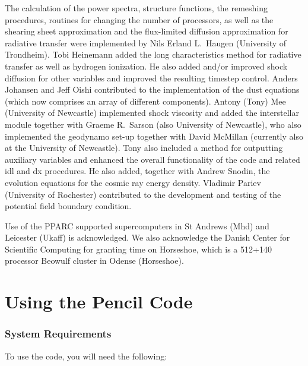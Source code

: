 \documentclass[\mydriver,12pt,twoside,notitlepage,a4paper]{article}
\begin{document}
The calculation of the power spectra, structure functions,
the remeshing procedures,
routines for changing the number of processors, as well as
the shearing sheet approximation and the flux-limited diffusion
approximation for radiative transfer
were implemented by Nils Erland L.\ Haugen (University of Trondheim).
Tobi Heinemann added the long characteristics method for
radiative transfer as well as hydrogen ionization.
He also added and/or improved shock diffusion for other variables
and improved the resulting timestep control.
Anders Johansen and Jeff Oishi contributed to the implementation of
the dust equations (which now comprises an array of different components).
Antony (Tony) Mee (University of Newcastle) implemented shock viscosity
and added the interstellar module together with
Graeme R.\ Sarson (also University of Newcastle), who also implemented
the geodynamo set-up together with David McMillan
(currently also at the University of Newcastle).
Tony also included a method for outputting auxiliary variables and
enhanced the overall functionality of the code and related idl and dx
procedures.
He also added, together with Andrew Snodin, the evolution equations
for the cosmic ray energy density.
Vladimir Pariev (University of Rochester) contributed to the development
and testing of the potential field boundary condition.

Use of the PPARC supported supercomputers in St Andrews (Mhd) and
Leicester (Ukaff) is acknowledged. We also acknowledge the Danish Center
for Scientific Computing for granting time on Horseshoe, which is a
512+140 processor Beowulf cluster in Odense (Horseshoe).

\clearpage
\tableofcontents
\cleardoublepage
\pagestyle{fancy}



\part{Using the {\sc Pencil Code}}

\section{System Requirements}

To use the code, you will need the following:
\end{document}
